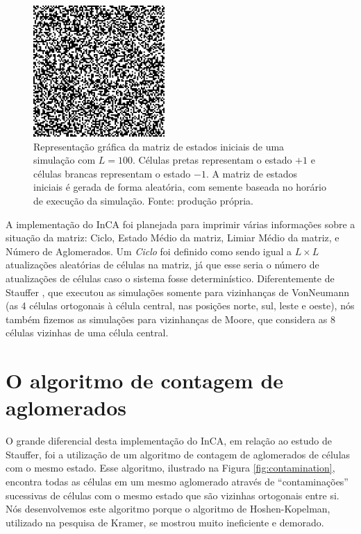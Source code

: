 \documentclass[
	12pt,				%
	openright,			%
	twoside,			%
	a4paper,			%
	english,			%
	french,				%
	spanish,			%
	brazil				%
	]{abntex2}
\begin{document}
\begin{figure}
    \centering
    \includegraphics[width=5cm]{matrizL100Ciclo0.png}
    \caption{Representação gráfica da matriz de estados iniciais de uma simulação com $L=100$. Células pretas representam o estado $+1$ e células brancas representam o estado $-1$. A matriz de estados iniciais é gerada de forma aleatória, com semente baseada no horário de execução da simulação. Fonte: produção própria.}
    \label{fig:matrizL100Ciclo0}
\end{figure}

A implementação do InCA foi planejada para imprimir várias informações sobre a situação da matriz: Ciclo, Estado Médio da matriz, Limiar Médio da matriz, e Número de Aglomerados. Um \textit{Ciclo} foi definido como sendo igual a $L\times L$ atualizações aleatórias de células na matriz, já que esse seria o número de atualizações de células caso o sistema fosse determinístico. Diferentemente de Stauffer \cite{stauffer}, que executou as simulações somente para vizinhanças de VonNeumann (as 4 células ortogonais à célula central, nas posições norte, sul, leste e oeste), nós também fizemos as simulações para vizinhanças de Moore, que considera as 8 células vizinhas de uma célula central.

\section{O algoritmo de contagem de aglomerados}

O grande diferencial desta implementação do InCA, em relação ao estudo de Stauffer, foi a utilização de um algoritmo de contagem de aglomerados de células com o mesmo estado. Esse algoritmo, ilustrado na Figura \ref{fig:contamination}, encontra todas as células em um mesmo aglomerado através de ``contaminações'' sucessivas de células com o mesmo estado que são vizinhas ortogonais entre si. Nós desenvolvemos este algoritmo porque o algoritmo de Hoshen-Kopelman, utilizado na pesquisa de Kramer, se mostrou muito ineficiente e demorado.
\end{document}
